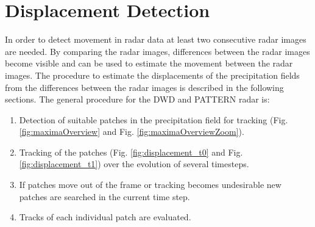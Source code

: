 \documentclass[11pt,twoside,a4paper,fleqn,x11names]{report}
\numberwithin{equation}{chapter}
\numberwithin{figure}{chapter}
\numberwithin{table}{chapter}
\begin{document}
\section{Displacement Detection}
\label{subsec:disdetect}
In order to detect movement in radar data at least two consecutive radar images are needed. By comparing the radar images, differences between the radar images become visible and can be used to estimate the movement between the radar images. The procedure to estimate the displacements of the precipitation fields from the differences between the radar images is described in the following sections. The general procedure for the DWD and PATTERN radar is:
\begin{enumerate}
	\item Detection of suitable patches in the precipitation field for tracking (Fig. \ref{fig:maximaOverview} and Fig. \ref{fig:maximaOverviewZoom}).
	\item Tracking of the patches (Fig. \ref{fig:displacement_t0} and Fig. \ref{fig:displacement_t1}) over the evolution of several timesteps.
	\item If patches move out of the frame or tracking becomes undesirable new patches are searched in the current time step.
	\item Tracks of each individual patch are evaluated.
\end{enumerate}

\end{document}
